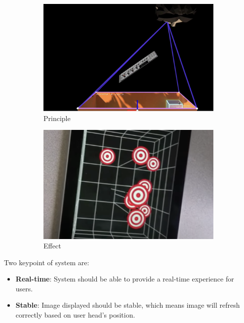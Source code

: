     \begin{figure}[htb]
        \centering
        \begin{subfigure}[t]{.45\linewidth}
            \centering
            \includegraphics[width=1\textwidth]{figures/example1.png}
            \caption{Principle}\label{F:test-b-sub-a}
        \end{subfigure}
        \begin{subfigure}[t]{.45\linewidth}
            \centering
            \includegraphics[width=1\textwidth]{figures/image.png}
            \caption{Effect}\label{F:test-b-sub-b}
        \end{subfigure}
        \caption{}\label{F:test-b}
    \end{figure}

    Two keypoint of system are:
    \begin{itemize}
        \item \textbf{Real-time}: System should be able to provide a real-time experience for users.
        \item \textbf{Stable}: Image displayed should be stable, which means image will refresh correctly based on user head's position.
    \end{itemize}

